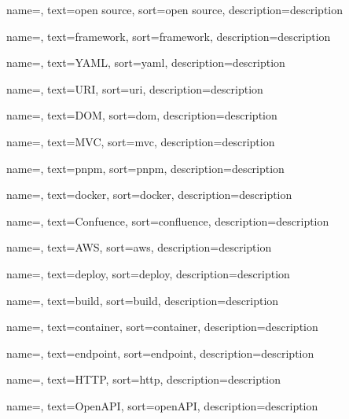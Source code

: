  {
    name=,
    text=open source,
    sort=open source,
    description={description}
}

 {
    name=,
    text=framework,
    sort=framework,
    description={description}
}

 {
    name=,
    text=YAML,
    sort=yaml,
    description={description}
}

 {
    name=,
    text=URI,
    sort=uri,
    description={description}
}

 {
    name=,
    text=DOM,
    sort=dom,
    description={description}
}

 {
    name=,
    text=MVC,
    sort=mvc,
    description={description}
}

 {
    name=,
    text=pnpm,
    sort=pnpm,
    description={description}
}

 {
    name=,
    text=docker,
    sort=docker,
    description={description}
}

 {
    name=,
    text=Confuence,
    sort=confluence,
    description={description}
}

 {
    name=,
    text=AWS,
    sort=aws,
    description={description}
}

 {
    name=,
    text=deploy,
    sort=deploy,
    description={description}
}

 {
    name=,
    text=build,
    sort=build,
    description={description}
}

 {
    name=,
    text=container,
    sort=container,
    description={description}
}

 {
    name=,
    text=endpoint,
    sort=endpoint,
    description={description}
}

 {
    name=,
    text=HTTP,
    sort=http,
    description={description}
}

 {
    name=,
    text=OpenAPI,
    sort=openAPI,
    description={description}
}

